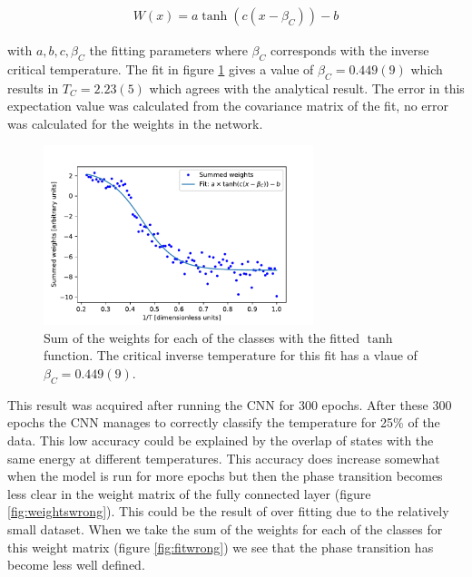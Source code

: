 \documentclass[10 pt, a4paper]{article}
\begin{document}
\begin{align*}
W(x) = a \tanh(c(x - \beta_C)) - b
\end{align*}

with $a,b,c,\beta_C$ the fitting parameters where $\beta_C$ corresponds with the inverse critical temperature. The fit in figure \ref{fig:fit} gives a value of $\beta_C = 0.449(9)$ which results in $T_C = 2.23(5)$ which agrees with the analytical result. The error in this expectation value was calculated from the covariance matrix of the fit, no error was calculated for the weights in the network.

\begin{figure}[H]
\centering
\includegraphics[width=0.7\textwidth]{fit}
\caption{Sum of the weights for each of the classes with the fitted $\tanh$ function. The critical inverse temperature for this fit has a vlaue of $\beta_C = 0.449(9)$. \label{fig:fit}}
\end{figure}

This result was acquired after running the CNN for 300 epochs. After these 300 epochs the CNN manages to correctly classify the temperature for 25\% of the data. This low accuracy could be explained by the overlap of states with the same energy at different temperatures. This accuracy does increase somewhat when the model is run for more epochs but then the phase transition becomes less clear in the weight matrix of the fully connected layer (figure \ref{fig:weightswrong}). This could be the result of over fitting due to the relatively small dataset. When we take the sum of the weights for each of the classes for this weight matrix (figure \ref{fig:fitwrong}) we see that the phase transition has become less well defined. 
\end{document}
